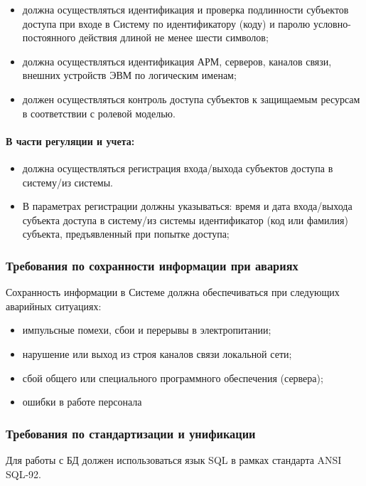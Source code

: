 \documentclass[a4paper,14pt]{extarticle}
\begin{document}
\begin{itemize}
	\item  должна осуществляться идентификация и проверка подлинности субъектов доступа при входе в Систему по идентификатору (коду) и паролю условно-постоянного действия длиной не менее шести символов;
	
	\item должна осуществляться идентификация АРМ, серверов, каналов связи, внешних устройств ЭВМ по логическим именам;
	
	\item должен осуществляться контроль доступа субъектов к защищаемым ресурсам в соответствии с ролевой моделью.
\end{itemize}
\paragraph*{В части регуляции и учета:}
\begin{itemize}
	\item  должна осуществляться регистрация входа/выхода субъектов доступа в систему/из системы.
	\item В параметрах регистрации должны указываться:
	\subitem время и дата входа/выхода субъекта доступа в систему/из системы
	\subitem идентификатор (код или фамилия) субъекта, предъявленный при попытке доступа;
\end{itemize}

\subsubsection{Требования по сохранности информации при авариях}
Сохранность информации в Системе должна обеспечиваться при следующих аварийных ситуациях:
\begin{itemize}
	\item импульсные помехи, сбои и перерывы в электропитании;
	\item нарушение или выход из строя каналов связи локальной сети;
	\item сбой общего или специального программного обеспечения (сервера);
	\item ошибки в работе персонала
\end{itemize}


\subsubsection{Требования по стандартизации и унификации}
Для работы с БД должен использоваться язык SQL в рамках стандарта ANSI SQL-92.
\end{document}
